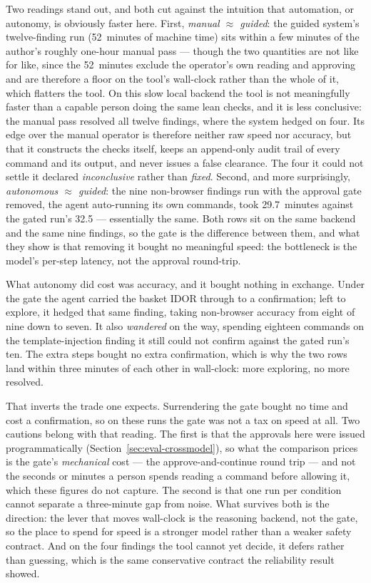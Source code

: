 Two readings stand out, and both cut against the intuition that automation, or
autonomy, is obviously faster here. First, \emph{manual $\approx$ guided}: the guided
system's twelve-finding run (52~minutes of machine time) sits within a few minutes of the
author's roughly one-hour manual pass --- though the two quantities are not like for
like, since the 52~minutes exclude the operator's own reading and approving and are
therefore a floor on the tool's wall-clock rather than the whole of it, which flatters
the tool. On this slow local backend the tool is not
meaningfully faster than a capable person doing the same lean checks, and it is less
conclusive: the manual pass resolved all twelve findings, where the system hedged on
four. Its edge over the manual operator is therefore neither raw speed nor accuracy, but
that it constructs the checks itself, keeps an append-only audit trail of every command
and its output, and never issues a false clearance. The four it could not settle it
declared \emph{inconclusive} rather than \emph{fixed}. Second, and more surprisingly,
\emph{autonomous $\approx$ guided}: the nine non-browser findings run with the approval
gate removed, the agent auto-running its own commands, took 29.7~minutes against the
gated run's 32.5 --- essentially the same. Both rows sit on the same backend and the same
nine findings, so the gate is the difference between them, and what they show is that
removing it bought no meaningful speed: the bottleneck is the model's per-step latency,
not the approval round-trip.

What autonomy did cost was accuracy, and it bought nothing in exchange. Under the gate
the agent carried the basket IDOR through to a confirmation; left to explore, it hedged
that same finding, taking non-browser accuracy from eight of nine down to seven. It also
\emph{wandered} on the way, spending eighteen commands on the template-injection finding
it still could not confirm against the gated run's ten. The extra steps bought no extra
confirmation, which is why the two rows land within three minutes of each other in
wall-clock: more exploring, no more resolved.

That inverts the trade one expects. Surrendering the gate bought no time and cost a
confirmation, so on these runs the gate was not a tax on speed at all. Two cautions belong
with that reading. The first is that the approvals here were issued programmatically
(Section~\ref{sec:eval-crossmodel}), so what the comparison prices is the gate's
\emph{mechanical} cost --- the approve-and-continue round trip --- and not the seconds or
minutes a person spends reading a command before allowing it, which these figures do not
capture. The second is that one run per condition cannot separate a three-minute gap from
noise. What survives both is the direction: the lever that moves wall-clock is the
reasoning backend, not the gate, so the place to spend for speed is a stronger model
rather than a weaker safety contract. And on the four findings the tool cannot yet decide,
it defers rather than guessing, which is the same conservative contract the reliability
result showed.

